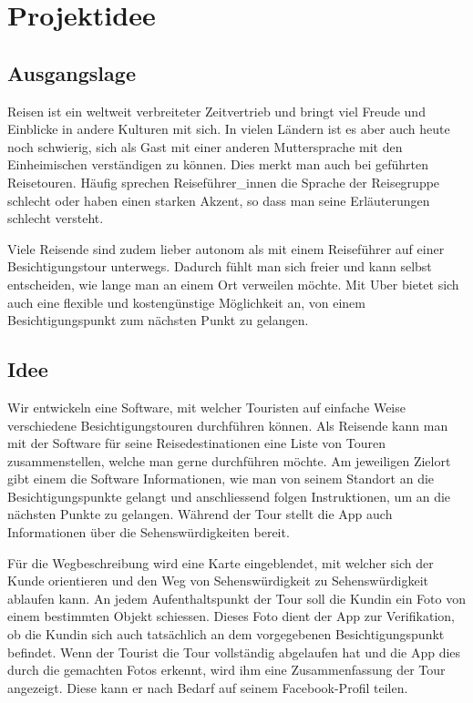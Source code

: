 \section{Projektidee}\label{Projektidee}
\subsection{Ausgangslage}\label{Ausgangslage}
Reisen ist ein weltweit verbreiteter Zeitvertrieb und bringt viel Freude und Einblicke in andere Kulturen mit sich. In vielen Ländern ist es aber auch heute noch schwierig, sich als Gast mit einer anderen Muttersprache mit den Einheimischen verständigen zu können. Dies merkt man auch bei geführten Reisetouren. Häufig sprechen Reiseführer\_innen die Sprache der Reisegruppe schlecht oder haben einen starken Akzent, so dass man seine Erläuterungen schlecht versteht.

Viele Reisende sind zudem lieber autonom als mit einem Reiseführer auf einer Besichtigungstour unterwegs. Dadurch fühlt man sich freier und kann selbst entscheiden, wie lange man an einem Ort verweilen möchte. Mit Uber bietet sich auch eine flexible und kostengünstige Möglichkeit an, von einem Besichtigungspunkt zum nächsten Punkt zu gelangen.

\subsection{Idee}\label{idee}
Wir entwickeln eine Software, mit welcher Touristen auf einfache Weise verschiedene Besichtigungstouren durchführen können.
Als Reisende kann man mit der Software für seine Reisedestinationen eine Liste von Touren zusammenstellen, welche man gerne durchführen möchte. Am jeweiligen Zielort gibt einem die Software Informationen, wie man von seinem Standort an die Besichtigungspunkte gelangt und anschliessend folgen Instruktionen, um an die nächsten Punkte zu gelangen. Während der Tour stellt die App auch Informationen über die Sehenswürdigkeiten bereit.

Für die Wegbeschreibung wird eine Karte eingeblendet, mit welcher sich der Kunde orientieren und den Weg von Sehenswürdigkeit zu Sehenswürdigkeit ablaufen kann. An jedem Aufenthaltspunkt der Tour soll die Kundin ein Foto von einem bestimmten Objekt schiessen. Dieses Foto dient der App zur Verifikation, ob die Kundin sich auch tatsächlich an dem vorgegebenen Besichtigungspunkt befindet. Wenn der Tourist die Tour vollständig abgelaufen hat und die App dies durch die gemachten Fotos erkennt, wird ihm eine Zusammenfassung der Tour angezeigt. Diese kann er nach Bedarf auf seinem Facebook-Profil teilen.

